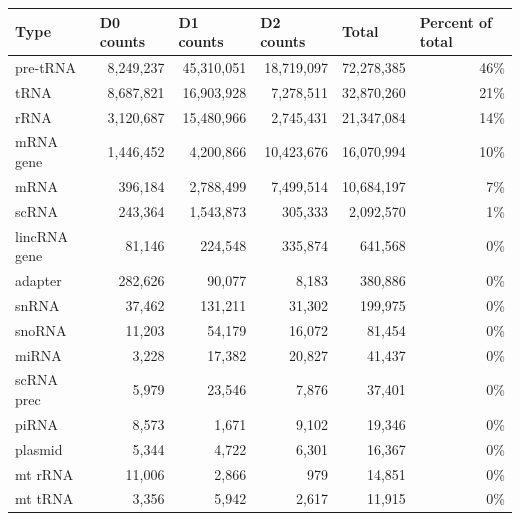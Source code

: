 \documentclass[12pt]{rockefeller}
\begin{document}
\begin{table}[!ht]
  \begin{adjustbox}{max width = \textwidth}
  \def\arraystretch{1.2}

  \begin{tabular}{|l|r|r|r|r|r|}
\hline
              Type &  \multicolumn{1}{l|}{D0 counts} &  \multicolumn{1}{l|}{D1 counts} &  \multicolumn{1}{l|}{D2 counts} &  \multicolumn{1}{l|}{Total} & \multicolumn{1}{l|}{Percent of total} \\
\hline  
       pre-tRNA &  8,249,237 &  45,310,051 &  18,719,097 &  72,278,385 &              46\% \\
            tRNA &  8,687,821 &  16,903,928 &   7,278,511 &  32,870,260 &              21\% \\
            rRNA &  3,120,687 &  15,480,966 &   2,745,431 &  21,347,084 &              14\% \\
       mRNA gene &  1,446,452 &   4,200,866 &  10,423,676 &  16,070,994 &              10\% \\
            mRNA &    396,184 &   2,788,499 &   7,499,514 &  10,684,197 &               7\% \\
           scRNA &    243,364 &   1,543,873 &     305,333 &   2,092,570 &               1\% \\
    lincRNA gene &     81,146 &     224,548 &     335,874 &     641,568 &               0\% \\
         adapter &    282,626 &      90,077 &       8,183 &     380,886 &               0\% \\
           snRNA &     37,462 &     131,211 &      31,302 &     199,975 &               0\% \\
          snoRNA &     11,203 &      54,179 &      16,072 &      81,454 &               0\% \\
           miRNA &      3,228 &      17,382 &      20,827 &      41,437 &               0\% \\
      scRNA prec &      5,979 &      23,546 &       7,876 &      37,401 &               0\% \\
           piRNA &      8,573 &       1,671 &       9,102 &      19,346 &               0\% \\
         plasmid &      5,344 &       4,722 &       6,301 &      16,367 &               0\% \\
         mt rRNA &     11,006 &       2,866 &         979 &      14,851 &               0\% \\
         mt tRNA &      3,356 &       5,942 &       2,617 &      11,915 &               0\% \\

\end{tabular}
\end{adjustbox}
\end{table}
\end{document}
